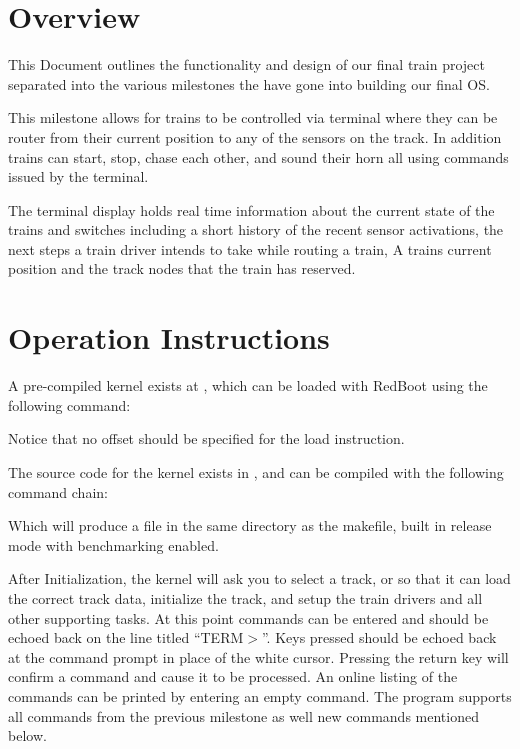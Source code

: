 \documentclass[pdftex,10pt,a4paper]{article}
\begin{document}
\finalprojectmake

\section*{Overview}

This Document outlines the functionality and design of our final train project
separated into the various milestones the have gone into building our final OS.

This milestone allows for trains to be controlled via terminal where they can
be router from their current position to any of the sensors on the track. In
addition trains can start, stop, chase each other, and sound their horn all
using commands issued by the terminal.

The terminal display holds real time information about the current state of the
trains and switches including a short history of the recent sensor activations,
the next steps a train driver intends to take while routing a train, A trains
current position and the track nodes that the train has reserved.

\section*{Operation Instructions}

A pre-compiled kernel exists at
, which can be loaded with
RedBoot using the following command:

\begin{center}
\end{center}

Notice that no offset should be specified for the load instruction.

The source code for the kernel exists in ,
and can be compiled with the following command chain:

\begin{center}
\end{center}

Which will produce a  file in the same directory as
the makefile, built in release mode with benchmarking enabled.

After Initialization, the kernel will ask you to select a track,
 or  so that it can load the correct track data,
initialize the track, and setup the train drivers and all other
supporting tasks.  At this point commands can be entered and should be
echoed back on the line titled ``TERM$>$''. Keys pressed should be
echoed back at the command prompt in place of the white
cursor. Pressing the return key will confirm a command and cause it to
be processed. An online listing of the commands can be printed by
entering an empty command. The program supports all commands from the
previous milestone as well new commands mentioned below.
\end{document}
